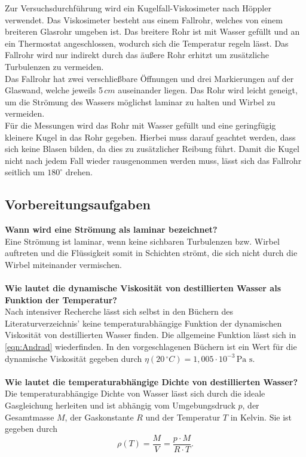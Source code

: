 Zur Versuchsdurchführung wird ein Kugelfall-Viskosimeter nach Höppler verwendet. Das Viskosimeter besteht aus einem Fallrohr, welches von
einem breiteren Glasrohr umgeben ist. Das breitere Rohr ist mit Wasser gefüllt und an ein Thermostat angeschlossen, wodurch sich die Temperatur regeln
lässt. Das Fallrohr wird nur indirekt durch das äußere Rohr erhitzt um zusätzliche Turbulenzen zu vermeiden.\\
Das Fallrohr hat zwei verschließbare Öffnungen und drei Markierungen auf der Glaswand, welche jeweils 5\,$\unit{cm}$ auseinander liegen. Das Rohr wird
leicht geneigt, um die Strömung des Wassers möglichst laminar zu halten und Wirbel zu vermeiden.\\
Für die Messungen wird das Rohr mit Wasser gefüllt und eine geringfügig kleinere Kugel in das Rohr gegeben. Hierbei muss darauf geachtet werden, dass sich keine 
Blasen bilden, da dies zu zusätzlicher Reibung führt. Damit die Kugel nicht nach jedem Fall wieder rausgenommen werden muss, lässt sich das Fallrohr seitlich um 
$\mathrm{180^{\circ}}$ drehen.\\

\subsection{Vorbereitungsaufgaben}

\textbf{Wann wird eine Strömung als laminar bezeichnet?} \\
Eine Strömung ist laminar, wenn keine sichbaren Turbulenzen bzw. Wirbel auftreten und die Flüssigkeit somit in Schichten strömt, die sich nicht durch die Wirbel
miteinander vermischen.\\ \\
\textbf{Wie lautet die dynamische Viskosität von destillierten Wasser als Funktion der Temperatur?}\\
Nach intensiver Recherche lässt sich selbst in den Büchern des Literaturverzeichnis' keine temperaturabhängige Funktion der dynamischen Viskosität von destillierten Wasser 
finden. Die allgemeine Funktion lässt sich in \autoref{eqn:Andrad} wiederfinden. In den vorgeschlagenen Büchern ist ein Wert für die dynamische Viskosität gegeben
durch $\eta(20 \, ^{\circ}\unit{C}) = 1,005 \cdot \mathrm{10^{-3} \, Pa \, \, s}$.\\ \\
\textbf{Wie lautet die temperaturabhängige Dichte von destillierten Wasser?}\\
Die temperaturabhängige Dichte von Wasser lässt sich durch die ideale Gasgleichung herleiten und ist abhängig vom Umgebungsdruck $p$, der Gesamtmasse $M$, der Gaskonstante
$R$ und der Temperatur $T$ in Kelvin. Sie ist gegeben durch
\begin{equation}
    \label{eqn:tempDichte}
    \rho(T) = \frac{M}{V} = \frac{p \cdot M}{R \cdot T}.
\end{equation}

\newpage